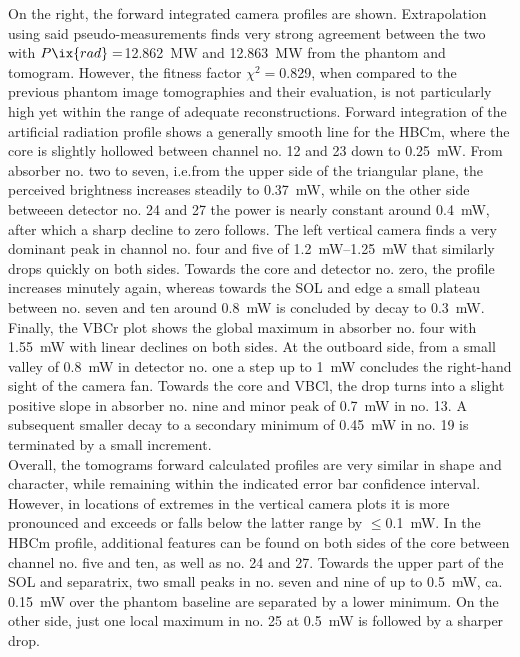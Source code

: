             On the right, the forward integrated camera profiles are shown. Extrapolation using said pseudo-measurements finds very strong agreement between the two with $P\ix{rad}=$\SI{12.862}{\mega\watt} and \SI{12.863}{\mega\watt} from the phantom and tomogram. However, the fitness factor $\chi^{2}=$\SI{0.829}{\arbitraryunit}, when compared to the previous phantom image tomographies and their evaluation, is not particularly high yet within the range of adequate reconstructions. Forward integration of the artificial radiation profile shows a generally smooth line for the HBCm, where the core is slightly hollowed between channel no. 12 and 23 down to \SI{0.25}{\milli\watt}. From absorber no. two to seven, i.e.from the upper side of the triangular plane, the perceived brightness increases steadily to \SI{0.37}{\milli\watt}, while on the other side betweeen detector no. 24 and 27 the power is nearly constant around \SI{0.4}{\milli\watt}, after which a sharp decline to zero follows. The left vertical camera finds a very dominant peak in channol no. four and five of \SIrange{1.2}{1.25}{\milli\watt} that similarly drops quickly on both sides. Towards the core and detector no. zero, the profile increases minutely again, whereas towards the SOL and edge a small plateau between no. seven and ten around \SI{0.8}{\milli\watt} is concluded by decay to \SI{0.3}{\milli\watt}. Finally, the VBCr plot shows the global maximum in absorber no. four with \SI{1.55}{\milli\watt} with linear declines on both sides. At the outboard side, from a small valley of \SI{0.8}{\milli\watt} in detector no. one a step up to \SI{1}{\milli\watt} concludes the right-hand sight of the camera fan. Towards the core and VBCl, the drop turns into a slight positive slope in absorber no. nine and minor peak of \SI{0.7}{\milli\watt} in no. 13. A subsequent smaller decay to a secondary minimum of \SI{0.45}{\milli\watt} in no. 19 is terminated by a small increment.\\%
            Overall, the tomograms forward calculated profiles are very similar in shape and character, while remaining within the indicated error bar confidence interval. However, in locations of extremes in the vertical camera plots it is more pronounced and exceeds or falls below the latter range by $\le$\SI{0.1}{\milli\watt}. In the HBCm profile, additional features can be found on both sides of the core between channel no. five and ten, as well as no. 24 and 27. Towards the upper part of the SOL and separatrix, two small peaks in no. seven and nine of up to \SI{0.5}{\milli\watt}, ca. \SI{0.15}{\milli\watt} over the phantom baseline are separated by a lower minimum. On the other side, just one local maximum in no. 25 at \SI{0.5}{\milli\watt} is followed by a sharper drop.\\%
